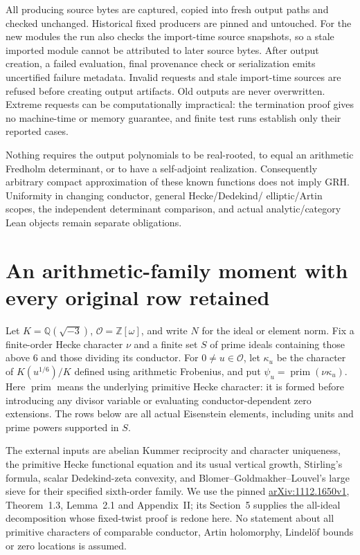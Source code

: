 \documentclass[11pt]{article}
\theoremstyle{definition}\newtheorem{definition}[theorem]{Definition}
\theoremstyle{remark}\newtheorem{remark}[theorem]{Remark}
\begin{document}
All producing source bytes are captured, copied into fresh output paths and
checked unchanged. Historical fixed producers are pinned and untouched.
For the new modules the run also checks the import-time source snapshots,
so a stale imported module cannot be attributed to later source bytes.
After output creation, a failed evaluation, final provenance check or
serialization emits uncertified failure metadata. Invalid requests and stale
import-time sources are refused before creating output artifacts. Old
outputs are never overwritten. Extreme requests can be
computationally impractical: the termination proof gives no machine-time or
memory guarantee, and finite test runs establish only their reported cases.

Nothing requires the output polynomials to be real-rooted, to equal an
arithmetic Fredholm determinant, or to have a self-adjoint realization.
Consequently arbitrary compact approximation of these known functions does
not imply GRH. Uniformity in changing conductor, general Hecke/Dedekind/
elliptic/Artin scopes, the independent determinant comparison, and actual
analytic/category Lean objects remain separate obligations.

\section{An arithmetic-family moment with every original row retained}
\label{mm:core}
Let $K=\mathbb Q(\sqrt{-3})$, $\mathcal O=\mathbb Z[\omega]$, and write
$N$ for the ideal or element norm. Fix a finite-order Hecke character
$\nu$ and a finite set $S$ of prime ideals containing those above $6$ and
those dividing its conductor. For $0\ne u\in\mathcal O$, let $\kappa_u$
be the character of $K(u^{1/6})/K$ defined using arithmetic Frobenius, and
put $\psi_u=\operatorname{prim}(\nu\kappa_u)$. Here
$\operatorname{prim}$ means the underlying primitive Hecke character:
it is formed before introducing any divisor variable or evaluating
conductor-dependent zero extensions. The rows below are all actual
Eisenstein elements, including units and prime powers supported in $S$.

The external inputs are abelian Kummer reciprocity and character
uniqueness, the primitive Hecke functional equation and its usual
vertical growth, Stirling's formula, scalar Dedekind-zeta convexity, and
Blomer--Goldmakher--Louvel's large sieve for their specified sixth-order
family. We use the pinned
\href{https://arxiv.org/pdf/1112.1650v1}{arXiv:1112.1650v1},
Theorem~1.3, Lemma~2.1 and Appendix~II; its Section~5 supplies the
all-ideal decomposition whose fixed-twist proof is redone here.
No statement about all primitive characters of comparable conductor,
Artin holomorphy, Lindel\"of bounds or zero locations is assumed.
\end{document}
